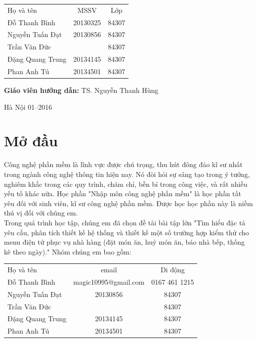 \documentclass[a4paper,12pt]{report}
\begin{document}
\begin{longtable}{l c c}

Họ và tên & MSSV  & Lớp\\
Đỗ Thanh Bình & 20130325 & 84307 \\
Nguyễn Tuấn Đạt &  20130856 & 84307 \\
Trần Văn  Đức &  & 84307 \\
Đặng Quang Trung & 20134145  & 84307 \\
Phan Anh Tú & 20134501  & 84307 \\

\end{longtable}

\hspace{1cm}\fontsize{14}{16}\selectfont \textbf{Giáo viên hướng dẫn: }TS. Nguyễn Thanh Hùng\\[2cm]
\begin{center}
\fontsize{16}{19}\selectfont Hà Nội 01--2016

\end{center}
\newpage
\tableofcontents
\chapter*{Mở đầu}
Công nghệ phần mềm là lĩnh vực được chú trọng, thu hút đông đảo kĩ sư nhất trong ngành công nghệ thông tin hiện nay. Nó đòi hỏi sự sáng tạo trong ý tưởng, nghiêm khắc trong các quy trình, chăm chỉ, bền bỉ trong công việc, và rất nhiều yếu tố khác nữa. Học phần "Nhập môn công nghệ phần mềm" là học phần tất yêu đối với sinh viên, kĩ sư công nghệ phần mềm. Được học học phần này là niềm thú vị đối với chúng em.\\

Trong quá trình học tập, chúng em đã chọn đề tài bài tập lớn "Tìm	hiểu đặc	tả yêu	cầu,	phân	tích	thiết	kế hệ thống	và	thiết	kế một	số
trường	hợp	kiểm	thử cho menu	điện	tử phục	vụ nhà	hàng (đặt	món	ăn,	huỷ món	
ăn,	báo	nhà	bếp,	thống	kê	theo	ngày)." Nhóm chúng em bao gồm:\\
\begin{longtable}{l c c}

Họ và tên & email  & Di động\\
Đỗ Thanh Bình & magic10995@gmail.com & 0167 461 1215 \\
Nguyễn Tuấn Đạt &  20130856 & 84307 \\
Trần Văn  Đức &  & 84307 \\
Đặng Quang Trung & 20134145  & 84307 \\
Phan Anh Tú & 20134501  & 84307 \\
\end{longtable}
\end{document}
